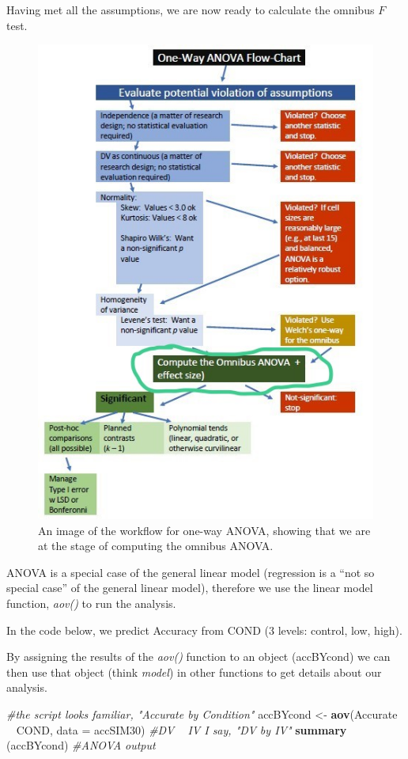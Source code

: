 \documentclass[
  english,
]{book}
\newenvironment{Shaded}{\begin{snugshade}}{\end{snugshade}}
\newcommand{\CommentTok}[1]{\textcolor[rgb]{0.56,0.35,0.01}{\textit{#1}}}
\newcommand{\DataTypeTok}[1]{\textcolor[rgb]{0.13,0.29,0.53}{#1}}
\newcommand{\KeywordTok}[1]{\textcolor[rgb]{0.13,0.29,0.53}{\textbf{#1}}}
\newcommand{\NormalTok}[1]{#1}
\newcommand{\OperatorTok}[1]{\textcolor[rgb]{0.81,0.36,0.00}{\textbf{#1}}}
\newcommand{\StringTok}[1]{\textcolor[rgb]{0.31,0.60,0.02}{#1}}
\begin{document}
Having met all the assumptions, we are now ready to calculate the omnibus \(F\) test.

\begin{figure}
\centering
\includegraphics{images/OnewayWrkFlw_omnibus.jpg}
\caption{An image of the workflow for one-way ANOVA, showing that we are at the stage of computing the omnibus ANOVA.}
\end{figure}

ANOVA is a special case of the general linear model (regression is a ``not so special case'' of the general linear model), therefore we use the linear model function, \emph{aov()} to run the analysis.

In the code below, we predict Accuracy from COND (3 levels: control, low, high).

By assigning the results of the \emph{aov()} function to an object (accBYcond) we can then use that object (think \emph{model}) in other functions to get details about our analysis.

\begin{Shaded}
\begin{Highlighting}[]
\CommentTok{#the script looks familiar, "Accurate by Condition"}
\NormalTok{accBYcond <-}\StringTok{ }\KeywordTok{aov}\NormalTok{(Accurate }\OperatorTok{~}\StringTok{ }\NormalTok{COND, }\DataTypeTok{data =}\NormalTok{ accSIM30) }\CommentTok{#DV ~ IV  I say, "DV by IV"}
\KeywordTok{summary}\NormalTok{ (accBYcond) }\CommentTok{#ANOVA output}
\end{Highlighting}
\end{Shaded}
\end{document}
